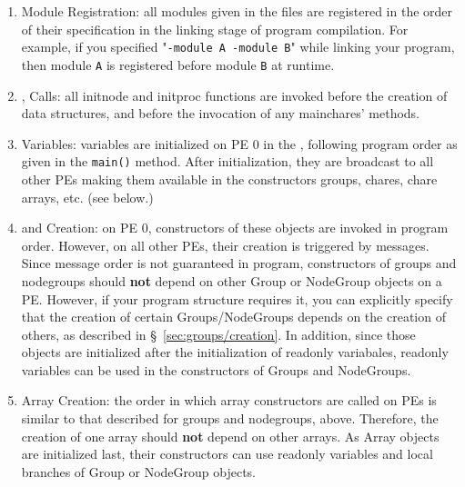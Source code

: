 \begin{enumerate}
\item Module Registration: all modules given in the  files are registered in the order
of their specification in the linking stage of program compilation.
For example, if you specified "{\tt -module A -module B}" while linking your \charmpp{} program,
then module {\tt A} is registered before module {\tt B} at runtime.

\item {},  Calls: all initnode and initproc functions are invoked before the
creation of \charmpp{} data structures, and before the invocation of any
mainchares'  methods.

\item {} Variables:  variables are initialized on PE 0 in the ,
following program order as given in the {\tt main()} method. After initialization, they
are broadcast to all other PEs making them available in the constructors
groups, chares, chare arrays, etc. (see below.)

\item {} and  Creation: on PE 0, constructors of these
objects are invoked in program order. However, on all other PEs, their
creation is triggered by messages. Since message order is not guaranteed
in \charmpp{} program, constructors of groups and nodegroups should \textbf{not} depend 
on other Group or NodeGroup objects on a PE. However, if your program structure requires
it, you can explicitly specify that the creation of certain Groups/NodeGroups depends
on the creation of others, as described in \S~\ref{sec:groups/creation}.
In addition, since those objects are initialized
after the initialization of readonly variabales, readonly variables can be used
in the constructors of Groups and NodeGroups.

\item \charmpp{} Array Creation: the order in which array constructors are called on PEs is
similar to that described for groups and nodegroups, above.
Therefore, the creation of one array should \textbf{not} depend on other arrays.
As Array objects are initialized last, their constructors can use 
readonly variables and local branches of Group or NodeGroup objects.
\end{enumerate}
